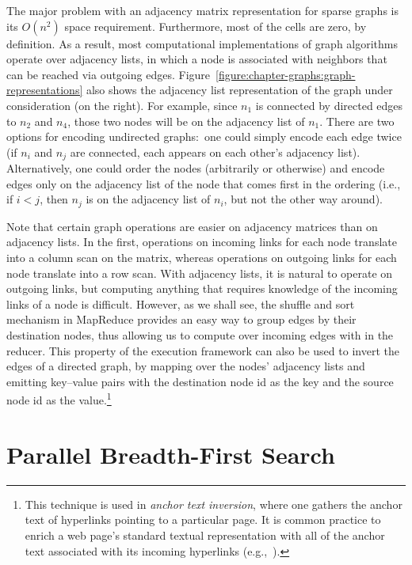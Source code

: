 The major problem with an adjacency matrix representation for sparse
graphs is its $O(n^2)$ space requirement.  Furthermore, most of the
cells are zero, by definition.  As a result, most computational
implementations of graph algorithms operate over adjacency lists, in
which a node is associated with neighbors that can be reached via
outgoing edges.
Figure~\ref{figure:chapter-graphs:graph-representations} also shows
the adjacency list representation of the graph under consideration (on
the right).  For example, since $n_1$ is connected by directed edges
to $n_2$ and $n_4$, those two nodes will be on the adjacency list of
$n_1$.  There are two options for encoding undirected graphs:\ one
could simply encode each edge twice (if $n_i$ and $n_j$ are connected,
each appears on each other's adjacency list).  Alternatively, one
could order the nodes (arbitrarily or otherwise) and encode edges only
on the adjacency list of the node that comes first in the ordering
(i.e., if $i<j$, then $n_j$ is on the adjacency list of $n_i$, but not
the other way around).

Note that certain graph operations are easier on adjacency matrices
than on adjacency lists.  In the first, operations on incoming links
for each node translate into a column scan on the matrix, whereas
operations on outgoing links for each node translate into a row scan.
With adjacency lists, it is natural to operate on outgoing links, but
computing anything that requires knowledge of the incoming links of a
node is difficult.  However, as we shall see, the shuffle and sort
mechanism in MapReduce provides an easy way to group edges by their
destination nodes, thus allowing us to compute over incoming edges
with in the reducer.  This property of the execution framework can
also be used to invert the edges of a directed graph, by mapping over
the nodes' adjacency lists and emitting key--value pairs with the
destination node id as the key and the source node id as the
value.\footnote{This technique is used in \emph{anchor text inversion},
  where one gathers the anchor text of hyperlinks pointing to a
  particular page.  It is common practice to enrich a web page's
  standard textual representation with all of the anchor text
  associated with its incoming hyperlinks
  (e.g.,~\cite{Metzler_etal_2009}).}

\section{Parallel Breadth-First Search}
\label{chapter-graphs:BFS}


